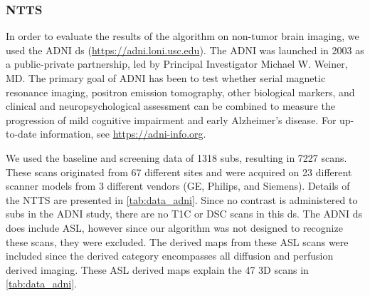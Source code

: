 \subsubsection{\gls{NTTS}}

In order to evaluate the results of the algorithm on non-\gls{tumor} brain imaging, we used the \acrfull{ADNI} \gls{ds} (\url{https://adni.loni.usc.edu}).
The \gls{ADNI} was launched in 2003 as a public-private partnership, led by Principal Investigator Michael W. Weiner, MD\@.
The primary goal of \gls{ADNI} has been to test whether serial magnetic resonance imaging, positron emission tomography, other biological markers, and clinical and neuropsychological assessment can be combined to measure the progression of mild cognitive impairment and early Alzheimer's disease.
For up-to-date information, see \url{https://adni-info.org}.

We used the baseline and screening data of \num{1318} \glspl{sub}, resulting in \num{7227} \glspl{scan}.
These \glspl{scan} originated from \num{67} different \glspl{site} and were acquired on \num{23} different scanner models from \num{3} different vendors (GE, Philips, and Siemens).
Details of the \gls{NTTS} are presented in \cref{tab:data_adni}.
Since no contrast is administered to \glspl{sub} in the \gls{ADNI} study, there are no \gls{T1C} or \gls{DSC} \glspl{scan} in this \gls{ds}.
The \gls{ADNI} \gls{ds} does include \gls{ASL}, however since our algorithm was not designed to recognize these \glspl{scan}, they were excluded.
The derived maps from these \gls{ASL} \glspl{scan} were included since the derived category encompasses all diffusion and perfusion derived imaging.
These \gls{ASL} derived maps explain the \num{47} 3D \glspl{scan} in \cref{tab:data_adni}.


